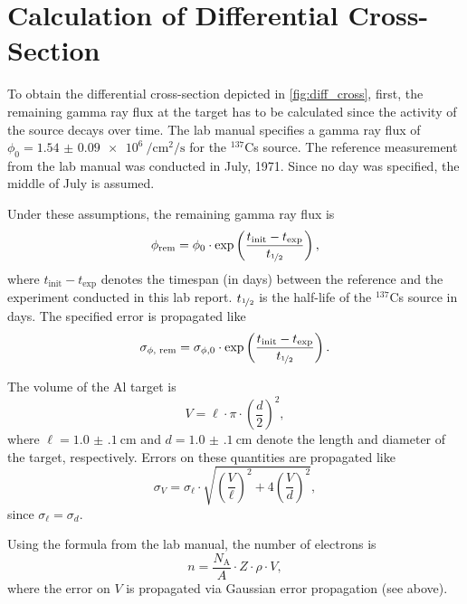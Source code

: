 \Appendix
\configureappendix

\section{Calculation of Differential Cross-Section}\label{appendix:cross}

To obtain the differential cross-section depicted in \autoref{fig:diff_cross}, first, the remaining gamma ray flux at the target has to be calculated since the activity of the source decays over time.
The lab manual specifies a gamma ray flux of $\phi_0 = \SI{1.54(9)e6}{\per\cm\squared\per\second}$ for the $^{137}$Cs source.
The reference measurement from the lab manual was conducted in July, 1971.
Since no day was specified, the middle of July is assumed.

Under these assumptions, the remaining gamma ray flux is
\begin{equation*}
	\phi_\text{rem} = \phi_0\cdot\exp\left(\frac{t_\text{init}-t_\text{exp}}{t_{\nicefrac{1}{2}}}\right),
\end{equation*}
where $t_\text{init}-t_\text{exp}$ denotes the timespan (in days) between the reference and the experiment conducted in this lab report.
$t_{\nicefrac{1}{2}}$ is the half-life of the $^{137}$Cs source in days.
The specified error is propagated like
\begin{equation*}
	\sigma_{\phi\text{, rem}} = \sigma_{\phi,0}\cdot\exp\left(\frac{t_\text{init}-t_\text{exp}}{t_{\nicefrac{1}{2}}}\right).
\end{equation*}

The volume of the Al target is
\begin{equation*}
	V = \ell\cdot\pi\cdot\left(\frac{d}{2}\right)^2,
\end{equation*}
where $\ell=\SI{1.0(1)}{\cm}$ and $d=\SI{1.0(1)}{\cm}$ denote the length and diameter of the target, respectively.
Errors on these quantities are propagated like
\begin{equation*}
	\sigma_V = \sigma_\ell\cdot\sqrt{\left(\frac{V}{\ell}\right)^2 + 4\left(\frac{V}{d}\right)^2},
\end{equation*}
since $\sigma_\ell=\sigma_d$.

Using the formula from the lab manual, the number of electrons is
\begin{equation*}
	n = \frac{N_\text{A}}{A}\cdot Z\cdot\rho\cdot V,
\end{equation*}
where the error on $V$ is propagated via Gaussian error propagation (see above).

